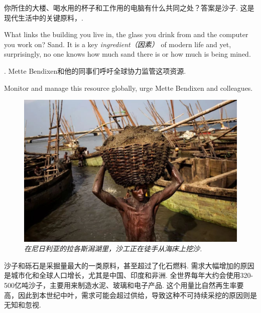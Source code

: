 \begin{multicols}{2}

你所住的大楼、喝水用的杯子和工作用的电脑有什么共同之处？答案是沙子. 这是现代生活中的关键原料，. 

What links the building you live in, the glass you drink from and the computer you work on? Sand. It is a key \emph{ingredient（因素）} of modern life and yet, surprisingly, no one knows how much sand there is or how much is being mined.


. Mette Bendixen和他的同事们呼吁全球协力监管这项资源. 

Monitor and manage this resource globally, urge Mette Bendixen and colleagues.


\begin{figure}[H]
\centering
\includegraphics[width=\linewidth]{IMG/201911/image6.jpeg}
\caption{\textit{在尼日利亚的拉各斯潟湖里，沙工正在徒手从海床上挖沙. }}
\end{figure}




沙子和砾石是采掘量最大的一类原料，甚至超过了化石燃料. 需求大幅增加的原因是城市化和全球人口增长，尤其是中国、印度和非洲. 全世界每年大约会使用320-500亿吨沙子，主要用来制造水泥、玻璃和电子产品. 这个用量比自然再生率要高，因此到本世纪中叶，需求可能会超过供给，导致这种不可持续采挖的原因则是无知和忽视. 


\end{multicols}
